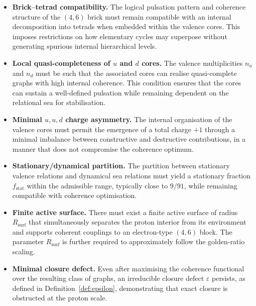 \documentclass[11pt,a4paper]{article}
\theoremstyle{definition}
\begin{document}
\begin{itemize}
  \item[(I1)] \textbf{Brick–tetrad compatibility.} The logical pulsation pattern and coherence structure of the $(4,6)$ brick must remain compatible with an internal decomposition into tetrads when embedded within the valence cores. This imposes restrictions on how elementary cycles may superpose without generating spurious internal hierarchical levels.\cite{PDL_Main_2026,Combinatorial_Proton_v2_2026}
  \item[(I2)] \textbf{Local quasi-completeness of $u$ and $d$ cores.} The valence multiplicities $n_u$ and $n_d$ must be such that the associated cores can realise quasi-complete graphs with high internal coherence. This condition ensures that the cores can sustain a well-defined pulsation while remaining dependent on the relational sea for stabilisation.\cite{Combinatorial_Proton_v2_2026}
  \item[(I3)] \textbf{Minimal $u,u,d$ charge asymmetry.} The internal organisation of the valence cores must permit the emergence of a total charge $+1$ through a minimal imbalance between constructive and destructive contributions, in a manner that does not compromise the coherence optimum.\cite{PDL_Main_2026,PDL_Global_Mapping_2026}
  \item[(I4)] \textbf{Stationary/dynamical partition.} The partition between stationary valence relations and dynamical sea relations must yield a stationary fraction $f_{\mathrm{stat}}$ within the admissible range, typically close to $9/91$, while remaining compatible with coherence optimisation.\cite{Combinatorial_Proton_v2_2026,PDL_Global_Mapping_2026}
  \item[(I5)] \textbf{Finite active surface.} There must exist a finite active surface of radius $R_{\mathrm{surf}}$ that simultaneously separates the proton interior from its environment and supports coherent couplings to an electron-type $(4,6)$ block. The parameter $R_{\mathrm{surf}}$ is further required to approximately follow the golden-ratio scaling.\cite{Golden_Ratio_Sketch_2026,Alpha_PDL_v2_2026,Effective_Fields_PDL_2026}
  \item[(I6)] \textbf{Minimal closure defect.} Even after maximising the coherence functional over the resulting class of graphs, an irreducible closure defect $\varepsilon$ persists, as defined in Definition~\ref{def:epsilon}, demonstrating that exact closure is obstructed at the proton scale.\cite{Exponent_18_PDL_2026,Topological_Reformulation_PDL_2026}
\end{itemize}
\end{document}
